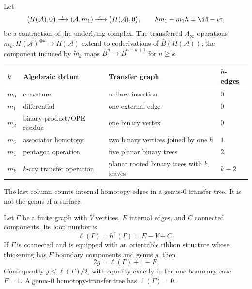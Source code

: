 \begin{definition}
\label{def:mk-family-feynman}
Let
\[
\bigl(H(\mathcal A),0\bigr)
\xrightarrow{\ \iota\ }
(\mathcal A,m_1)
\xrightarrow{\ \pi\ }
\bigl(H(\mathcal A),0\bigr),
\qquad
h m_1+m_1h=\id-\iota\pi,
\]
be a contraction of the underlying complex.  The transferred
\(A_\infty\) operations
\(\widetilde m_k\colon H(\mathcal A)^{\otimes k}\to H(\mathcal A)\)
extend to coderivations of \(\bar B(H(\mathcal A))\); the component
induced by \(\widetilde m_k\) maps
\(\bar B^n\to \bar B^{n-k+1}\) for \(n\geq k\).

\begin{center}
\begin{tabular}{|>{\raggedright\arraybackslash}p{1.2cm}|>{\raggedright\arraybackslash}p{4.2cm}|>{\raggedright\arraybackslash}p{5.6cm}|>{\raggedright\arraybackslash}p{1.8cm}|}
\hline
\textbf{$k$} & \textbf{Algebraic datum} & \textbf{Transfer graph} & \textbf{$h$-edges} \\
\hline
\(m_0\) & curvature & nullary insertion & \(0\) \\
\hline
\(m_1\) & differential & one external edge & \(0\) \\
\hline
\(m_2\) & binary product/OPE residue & one binary vertex & \(0\) \\
\hline
\(m_3\) & associator homotopy & two binary vertices joined by one \(h\) & \(1\) \\
\hline
\(m_4\) & pentagon operation & five planar binary trees & \(2\) \\
\hline
\(m_k\) & \(k\)-ary transfer operation & planar rooted binary trees with \(k\) leaves & \(k-2\) \\
\hline
\end{tabular}
\end{center}
The last column counts internal homotopy edges in a genus-\(0\)
transfer tree.  It is not the genus of a surface.
\end{definition}

\begin{theorem}
\label{thm:loop-genus-formula}
Let \(\Gamma\) be a finite graph with \(V\) vertices, \(E\) internal
edges, and \(C\) connected components.  Its loop number is
\[
\ell(\Gamma)=h^1(\Gamma)=E-V+C.
\]
If \(\Gamma\) is connected and is equipped with an orientable ribbon
structure whose thickening has \(F\) boundary components and genus
\(g\), then
\[
2g=\ell(\Gamma)+1-F.
\]
Consequently \(g\leq \ell(\Gamma)/2\), with equality exactly in the
one-boundary case \(F=1\).  A genus-\(0\) homotopy-transfer tree has
\(\ell(\Gamma)=0\).
\end{theorem}

